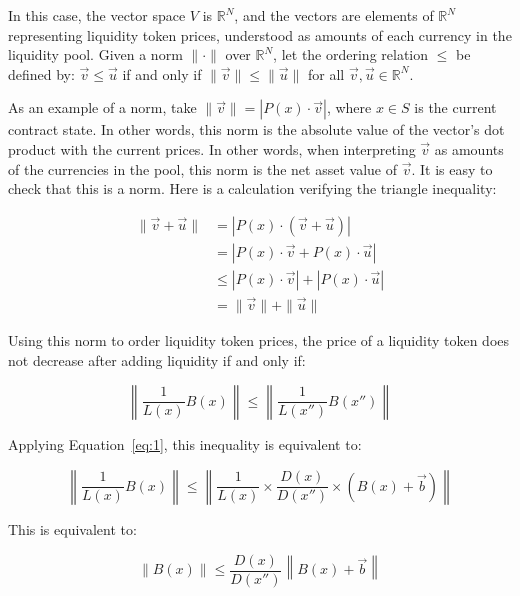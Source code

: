 \documentclass[12pt]{article}
\begin{document}
In this case, the vector space $V$ is $\mathbb{R}^N$, and the vectors are elements of $\mathbb{R}^N$ representing liquidity token prices, understood as amounts of each currency in the liquidity pool. Given a norm $\|\cdot\|$ over $\mathbb{R}^N$, let the ordering relation $\leq$ be defined by: $\vec{v} \leq \vec{u}$ if and only if $\|\vec{v}\| \leq \|\vec{u}\|$ for all $\vec{v}, \vec{u} \in \mathbb{R}^N$.

 As an example of a norm, take $\|\vec{v}\| =  |P(x) \cdot \vec{v}|$, where $x \in S$ is the current contract state. In other words, this norm is the absolute value of the vector's dot product with the current prices. In other words, when interpreting $\vec{v}$ as amounts of the currencies in the pool, this norm is the net asset value of $\vec{v}$. It is easy to check that this is a norm. Here is a calculation verifying the triangle inequality:

 \begin{equation*}
	 \begin{split}
		 \|\vec{v}+\vec{u}\| & = |P(x) \cdot (\vec{v} + \vec{u})| \\
		  		     & = |P(x) \cdot \vec{v} + P(x) \cdot \vec{u}| \\
				     & \leq |P(x) \cdot \vec{v}| + |P(x) \cdot \vec{u}| \\
				     & = \|\vec{v}\| + \|\vec{u}\|
	 \end{split}
 \end{equation*}

 Using this norm to order liquidity token prices, the price of a liquidity token does not decrease after adding liquidity if and only if:

 \begin{equation*}
	 \left\|\frac{1}{L(x)} B(x)\right\| \leq \left\|\frac{1}{L(x'')} B(x'')\right\|
 \end{equation*}

 Applying Equation~\ref{eq:1}, this inequality is equivalent to:

 \begin{equation*}
	 \left\|\frac{1}{L(x)} B(x) \right\| \leq \left\|\frac{1}{L(x)} \times \frac{D(x)}{D(x'')} \times (B(x) + \vec{b}) \right\|
 \end{equation*}

 This is equivalent to:

 \begin{equation*}
	 \left\|B(x)\right\| \leq \frac{D(x)}{D(x'')} \left\| B(x) + \vec{b} \right\|
 \end{equation*}
\end{document}

